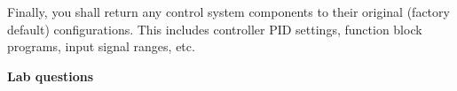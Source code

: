 \vskip 10pt

Finally, you shall return any control system components to their original (factory default) configurations.  This includes controller PID settings, function block programs, input signal ranges, etc.



































\vfil \eject

\noindent
{\bf Lab questions}

\vskip 20pt




